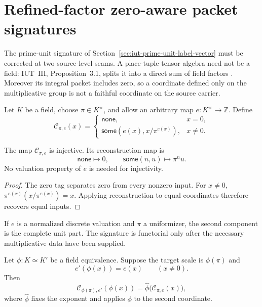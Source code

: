 \section{Refined-factor zero-aware packet signatures}
\label{sec:iut-refined-factor-signature}

The prime-unit signature of Section~\ref{sec:iut-prime-unit-label-vector}
must be corrected at two source-level seams.  A place-tuple tensor algebra
need not be a field: IUT~III, Proposition~3.1, splits it into a direct sum of
field factors \cite{IUT3}.  Moreover its integral packet includes zero, so a
coordinate defined only on the multiplicative group is not a faithful
coordinate on the source carrier.

Let $K$ be a field, choose $\pi\in K^\times$, and allow an arbitrary map
$e:K^\times\to\mathbb Z$.  Define
\[
 \mathcal C_{\pi,e}(x)=
 \begin{cases}
  \mathsf{none},&x=0,\\
  \mathsf{some}\left(e(x),x/\pi^{e(x)}\right),&x\ne0.
 \end{cases}
\]

\begin{theorem}
\label{thm:zero-aware-reconstruction}
The map $\mathcal C_{\pi,e}$ is injective.  Its reconstruction map is
\[
 \mathsf{none}\longmapsto0,\qquad
 \mathsf{some}(n,u)\longmapsto\pi^nu.
\]
No valuation property of $e$ is needed for injectivity.
\end{theorem}

\begin{proof}
The zero tag separates zero from every nonzero input.  For $x\ne0$,
$\pi^{e(x)}(x/\pi^{e(x)})=x$.  Applying reconstruction to equal coordinates
therefore recovers equal inputs.
\end{proof}

If $e$ is a normalized discrete valuation and $\pi$ a uniformizer, the
second component is the complete unit part.  The signature is functorial only
after the necessary multiplicative data have been supplied.

\begin{theorem}
\label{thm:refined-factorwise-covariance}
Let $\phi:K\simeq K'$ be a field equivalence.  Suppose the target scale is
$\phi(\pi)$ and
\[
                   e'(\phi(x))=e(x)\qquad(x\ne0).
\]
Then
\[
 \mathcal C_{\phi(\pi),e'}(\phi(x))
 =\widehat\phi\bigl(\mathcal C_{\pi,e}(x)\bigr),
\]
where $\widehat\phi$ fixes the exponent and applies $\phi$ to the second
coordinate.
\end{theorem}

